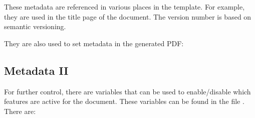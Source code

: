 These metadata are referenced in various places in the template. For example,
they are used in the title page of the document. The version number is based
on semantic versioning.


They are also used to set metadata in the generated PDF:


\subsection{Metadata II}\label{subsec:Metadata-II}

For further control, there are variables that can be used to enable/disable
which features are active for the document. These variables can be found
in the file . There are:

